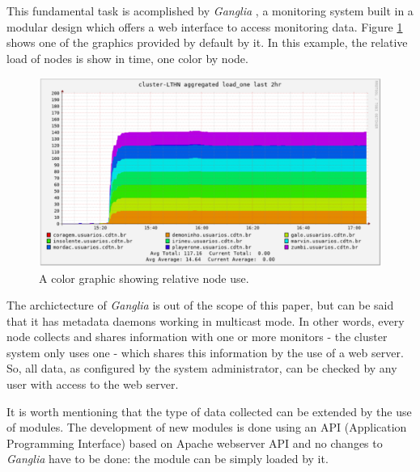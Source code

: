\documentclass[twoside,a4paper,12pt,english]{inac19}
\begin{document}

This fundamental task is acomplished by \textit{Ganglia} \cite{ganglia}, a monitoring system built in
a modular design which offers a web interface to access monitoring data. Figure \ref{fig:ganglia-rainbow} shows
one of the graphics provided by default by it. In this example, the relative load of nodes is show in time,
one color by node.

\begin{figure}[th] %
  \centering\includegraphics[scale=0.55]{images/ganglia_rainbow.png}
  \caption{A color graphic showing relative node use.}
  \label{fig:ganglia-rainbow}
\end{figure}

The archictecture of \textit{Ganglia} is out of the scope of this paper, but can be said that it has metadata
daemons working in multicast mode. In other words, every node collects and shares information with one or
more monitors - the cluster system only uses one - which shares this information by the use of a web server.
So, all data, as configured by the system administrator, can be checked by any user with access to the
web server.

It is worth mentioning that the type of data collected can be extended by the use of modules. The development
of new modules is done using an API (Application Programming Interface) based on Apache webserver API \cite{apache}
and no changes to \textit{Ganglia} have to be done: the module can be simply loaded by it.

\end{document}
